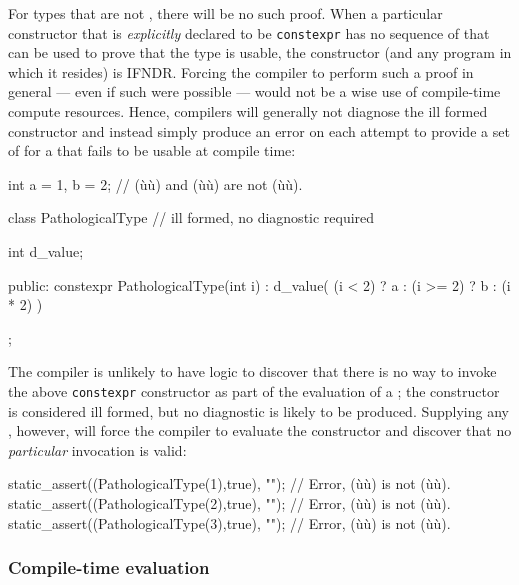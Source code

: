 \begin{enumerate}
{\noindent For types that are not , there will
be no such proof. When a particular constructor that is
\emph{explicitly} declared to be \lstinline!constexpr! has no sequence of
 that can be used to prove that the type is
usable, the constructor (and any program in which it resides) is IFNDR.
Forcing the compiler to perform such a proof in general --- even if such
were possible --- would not be a wise use of compile-time compute
resources. Hence, compilers will generally not diagnose the ill formed
constructor and instead simply produce an error on each attempt to
provide a set of  for a  that
fails to be usable at compile time:

\begin{emcppslisting} %
int a = 1, b = 2;  // (ù{}ù) and (ù{}ù) are not (ù{}ù).

class PathologicalType  // ill formed, no diagnostic required
{
    int d_value;

public:
    constexpr PathologicalType(int i)
        : d_value( (i <  2) ? a
                 : (i >= 2) ? b
                 : (i * 2) ) { }
};
\end{emcppslisting}
    

\noindent The compiler is unlikely to have logic to discover that there is no way
to invoke the above \lstinline!constexpr! constructor as part of the
evaluation of a ; the constructor is
considered ill formed, but no diagnostic is likely to be produced.
Supplying any , however, will force the
compiler to evaluate the constructor and discover that no
\emph{particular} invocation is valid:

\begin{emcppslisting} %
static_assert((PathologicalType(1),true), "");  // Error, (ù{}ù) is not (ù{}ù).
static_assert((PathologicalType(2),true), "");  // Error, (ù{}ù) is not (ù{}ù).
static_assert((PathologicalType(3),true), "");  // Error, (ù{}ù) is not (ù{}ù).
\end{emcppslisting}
}
\end{enumerate}
    

\subsubsection[Compile-time evaluation]{Compile-time evaluation}\label{compile-time-evaluation}

